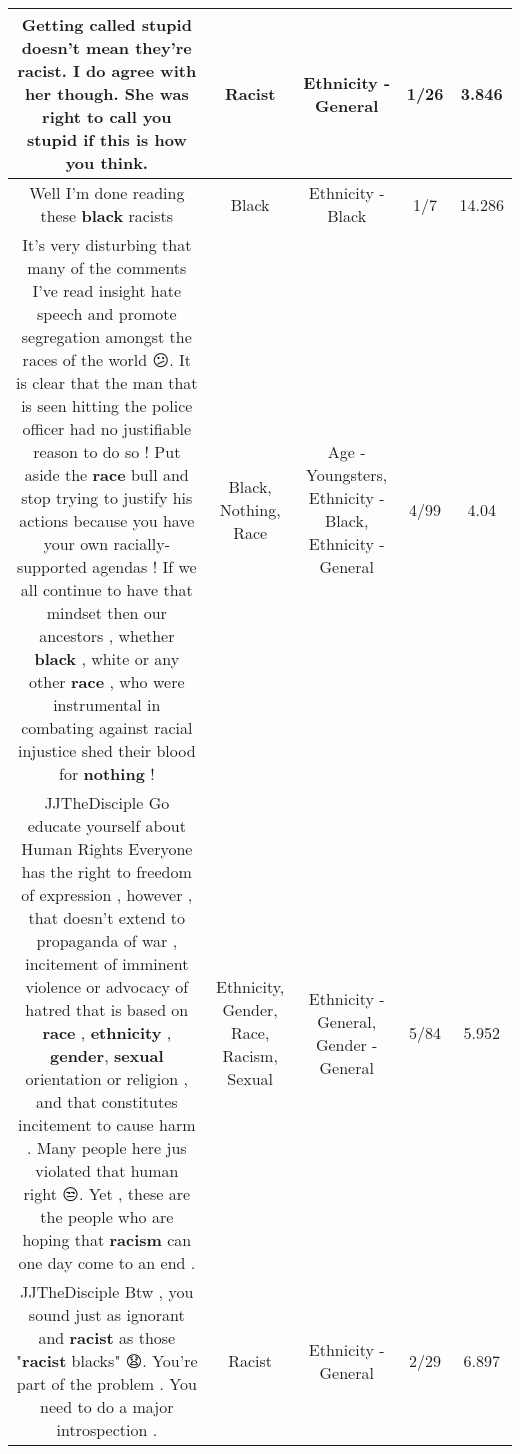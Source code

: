 \documentclass[11pt]{article}
\newlength\mylength
\begin{document}
\begin{center}
\begin{longtable}{|C{.65\mylength}|C{.30\mylength}|C{.12\mylength}|C{.12\mylength}|C{.12\mylength}|}
  \small Getting called stupid doesn't mean they're \textbf{racist}. I do agree with her though. She was right to call you stupid if this is how you think.\normalsize   & Racist & Ethnicity - General & 1/26 & 3.846 \\  \hline
  \small Well I'm done reading these \textbf{black} racists\normalsize   & Black & Ethnicity - Black & 1/7 & 14.286 \\  \hline
  \small It's very disturbing that many of the comments I've read insight hate speech and promote segregation amongst the races of the world 😕. It is clear that the man that is seen hitting the police officer had no justifiable reason to do so ! Put aside the \textbf{race} bull and stop trying to justify his actions because you have your own racially-supported agendas ! If we all continue to have that mindset then our ancestors , whether \textbf{black} , white or any other \textbf{race} , who were instrumental in combating against racial injustice shed their blood for \textbf{nothing} !\normalsize   & Black, Nothing, Race & Age - Youngsters, Ethnicity - Black, Ethnicity - General & 4/99 & 4.04 \\  \hline
  \small JJTheDisciple Go educate yourself about Human Rights Everyone has the right to freedom of expression , however , that doesn't extend to propaganda of war , incitement of imminent violence or advocacy of hatred that is based on \textbf{race} , \textbf{ethnicity} , \textbf{gender}, \textbf{sexual} orientation or religion , and that constitutes incitement to cause harm . Many people here jus violated that human right 😒. Yet , these are the people who are hoping that \textbf{racism} can one day come to an end .\normalsize   & Ethnicity, Gender, Race, Racism, Sexual & Ethnicity - General, Gender - General & 5/84 & 5.952 \\  \hline
  \small JJTheDisciple Btw , you sound just as ignorant and \textbf{racist} as those "\textbf{racist} blacks" 😧. You're part of the problem . You need to do a major introspection .\normalsize   & Racist & Ethnicity - General & 2/29 & 6.897 \\  \hline

\end{longtable}
\end{center}
\end{document}
